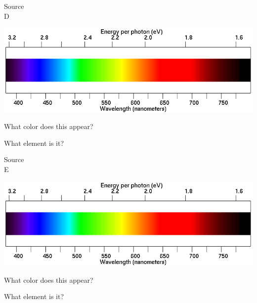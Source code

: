 \documentclass[11pt]{article}
\begin{document}
\vspace{1in}

\begin{minipage}{0.1\textwidth}
	\begin{center}
		\Large Source \\ D
	\end{center}
\end{minipage}
\begin{minipage}{0.8\textwidth}
	\includegraphics[width=\textwidth]{spectrum2.png}
\end{minipage}

\begin{minipage}{0.5\textwidth}
	What color does this appear?
\end{minipage}
\begin{minipage}{0.5\textwidth}
	What element is it?
\end{minipage}

\vspace{1in}

\begin{minipage}{0.1\textwidth}
	\begin{center}
		\Large Source \\ E
	\end{center}
\end{minipage}
\begin{minipage}{0.8\textwidth}
	\includegraphics[width=\textwidth]{spectrum2.png}
\end{minipage}

\begin{minipage}{0.5\textwidth}
	What color does this appear?
\end{minipage}
\begin{minipage}{0.5\textwidth}
	What element is it?
\end{minipage}
\end{document}
